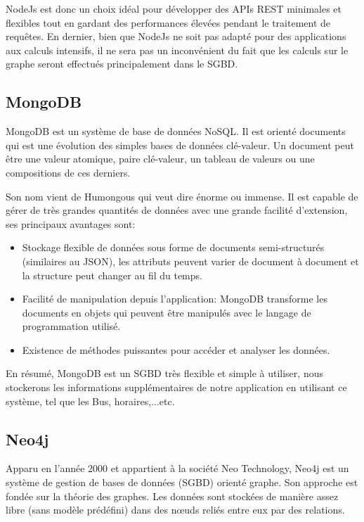 NodeJs est donc un choix idéal pour développer des APIs REST minimales et flexibles tout en gardant des performances élevées pendant le traitement de requêtes.\newline
En dernier, bien que NodeJs ne soit pas adapté pour des applications aux calculs intensifs, il ne sera pas un inconvénient du fait que les calculs sur le graphe seront effectués principalement dans le \acrfull{SGBD}.
\subsection{MongoDB}
	MongoDB \cite{MongoDB} est un système de base de données \Gls{NoSQL}. Il est orienté documents qui est une évolution des simples bases de données clé-valeur. Un document peut être une valeur atomique, paire clé-valeur, un tableau de valeurs ou une compositions de ces derniers.

Son nom vient de Humongous qui veut dire énorme ou immense. Il est capable de gérer de très grandes quantités de données avec une grande facilité d'extension, ses principaux avantages sont:

\begin{itemize}
	\item Stockage flexible de données sous forme de documents semi-structurés (similaires au JSON), les attributs peuvent varier de document à document et la structure peut changer au fil du temps.
	\item Facilité de manipulation depuis l'application: MongoDB transforme les documents en objets qui peuvent être manipulés avec le langage de programmation utilisé.
	\item Existence de méthodes puissantes pour accéder et analyser les données.
\end{itemize}

En résumé, MongoDB est un SGBD très flexible et simple à utiliser, nous stockerons les informations supplémentaires de notre application en utilisant ce système, tel que les Bus, horaires,...etc.

\subsection{Neo4j}
Apparu en l'année 2000 et appartient à la société Neo Technology, Neo4j \cite{Neo4j} est un système de gestion de bases de données (SGBD) orienté graphe. Son approche est fondée sur la théorie des graphes. Les données sont stockées de manière assez libre (sans modèle prédéfini) dans des nœuds reliés entre eux par des relations.

